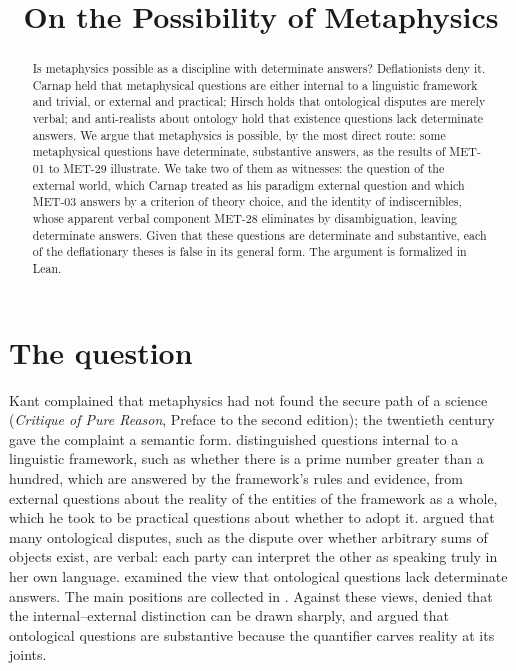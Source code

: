 \documentclass{situationist-preprint}
\title{On the Possibility of Metaphysics}
\begin{document}
\maketitle

\begin{abstract}
Is metaphysics possible as a discipline with determinate answers? Deflationists deny it. Carnap held that metaphysical questions are either internal to a linguistic framework and trivial, or external and practical; Hirsch holds that ontological disputes are merely verbal; and anti-realists about ontology hold that existence questions lack determinate answers. We argue that metaphysics is possible, by the most direct route: some metaphysical questions have determinate, substantive answers, as the results of MET-01 to MET-29 illustrate. We take two of them as witnesses: the question of the external world, which Carnap treated as his paradigm external question and which MET-03 answers by a criterion of theory choice, and the identity of indiscernibles, whose apparent verbal component MET-28 eliminates by disambiguation, leaving determinate answers. Given that these questions are determinate and substantive, each of the deflationary theses is false in its general form. The argument is formalized in Lean.
\end{abstract}

\section{The question}

Kant complained that metaphysics had not found the secure path of a science (\emph{Critique of Pure Reason}, Preface to the second edition); the twentieth century gave the complaint a semantic form. \citet{Carnap1950} distinguished questions internal to a linguistic framework, such as whether there is a prime number greater than a hundred, which are answered by the framework's rules and evidence, from external questions about the reality of the entities of the framework as a whole, which he took to be practical questions about whether to adopt it. \citet{Hirsch2011} argued that many ontological disputes, such as the dispute over whether arbitrary sums of objects exist, are verbal: each party can interpret the other as speaking truly in her own language. \citet{Chalmers2009} examined the view that ontological questions lack determinate answers. The main positions are collected in \citet{ChalmersManleyWasserman2009}. Against these views, \citet{Quine1951} denied that the internal--external distinction can be drawn sharply, and \citet{Sider2011} argued that ontological questions are substantive because the quantifier carves reality at its joints.
\end{document}
